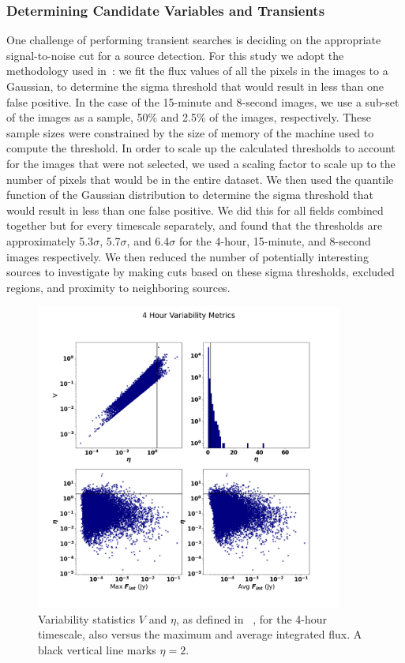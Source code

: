 \documentclass[12pt]{article}
\begin{document}
\subsubsection{Determining Candidate Variables and Transients}
\label{sec:determinecand}
One challenge of performing transient searches is deciding on the appropriate signal-to-noise cut for a source detection. For this study we adopt the methodology used in~\citet{2022MNRAS.517.2894R}: we fit the flux values of all the pixels in the images to a Gaussian, to determine the sigma threshold that would result in less than one false positive. In the case of the 15-minute and 8-second images, we use a sub-set of the images as a sample, 50\% and 2.5\% of the images, respectively. These sample sizes were constrained by the size of memory of the machine used to compute the threshold. In order to scale up the calculated thresholds to account for the images that were not selected, we used a scaling factor to scale up to the number of pixels that would be in the entire dataset. We then used the quantile function of the Gaussian distribution to determine the sigma threshold that would result in less than one false positive. We did this for all fields combined together but for every timescale separately, and found that the thresholds are approximately 5.3$\sigma$, 5.7$\sigma$, and 6.4$\sigma$ for the 4-hour, 15-minute, and 8-second images respectively. We then reduced the number of potentially interesting sources to investigate by making cuts based on these sigma thresholds, excluded regions, and proximity to neighboring sources.
\begin{figure}
	\includegraphics[width=0.9\textwidth]{4_Hour_Variability_Metrics.png}
	\caption{Variability statistics $V$ and $\eta$, as defined in ~\citet{2015A&C....11...25S}, for the 4-hour timescale, also versus the maximum and average integrated flux. A black vertical line marks $\eta=2$.}
	\label{fig:varstat4hr}
\end{figure}
\end{document}

